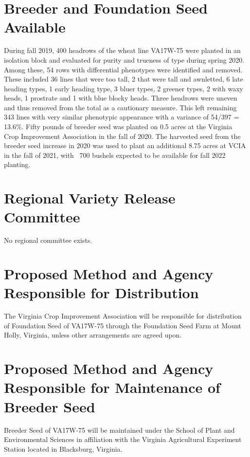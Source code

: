 \documentclass[12pt, letterpaper]{article}
\begin{document}
\section{Breeder and Foundation Seed Available}

During fall 2019, 400 headrows of the wheat line VA17W-75 were planted in an isolation block and evaluated for purity and trueness of type during spring 2020. Among these, 54 rows with differential phenotypes were identified and removed. These included 36 lines that were too tall, 2 that were tall and awnletted, 6 late heading types, 1 early heading type, 3 bluer types, 2 greener types, 2 with waxy heads, 1 prostrate and 1 with blue blocky heads. Three headrows were uneven and thus removed from the total as a cautionary measure. This left remaining 343 lines with very similar phenotypic appearance with a variance of 54/397 = 13.6\%. Fifty pounds of breeder seed was planted on 0.5 acres at the Virginia Crop Improvement Association in the fall of 2020. The harvested seed from the breeder seed increase in 2020 was used to plant an additional 8.75 acres at VCIA in the fall of 2021, with ~700 bushels expected to be available for fall 2022 planting. 

\section{Regional Variety Release Committee}

No regional committee exists.

\section{Proposed Method and Agency Responsible for Distribution}

The Virginia Crop Improvement Association will be responsible for distribution of Foundation Seed of VA17W-75 through the Foundation Seed Farm at Mount Holly, Virginia, unless other arrangements are agreed upon.

\section{Proposed Method and Agency Responsible for Maintenance of Breeder Seed}


Breeder Seed of VA17W-75 will be maintained under the School of Plant and Environmental Sciences in affiliation with the Virginia Agricultural Experiment Station located in Blacksburg, Virginia.
\end{document}
